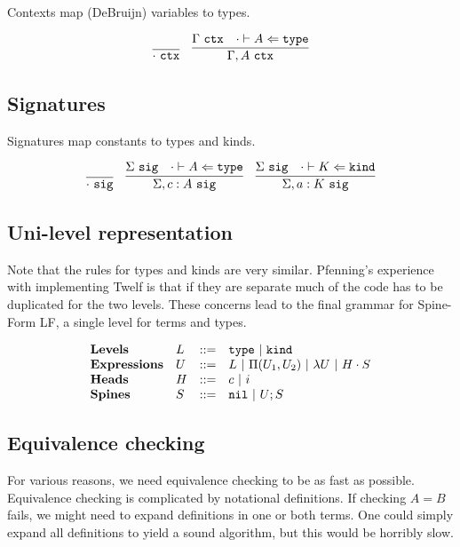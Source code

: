 \documentclass[11pt,twoside]{article}
\begin{document}
Contexts map (DeBruijn) variables to types.  

\newcommand{\Ctx}{\ \mathtt{ctx}}
\bigskip 
\framebox{$\Gamma\Ctx$}
\bigskip 

$$
\begin{array}{cc}
\infer{\cdot\Ctx}{} &
\infer{\Gamma,A\Ctx}{\Gamma\Ctx & \CheckTy[\cdot]{A}{\Type}}
\end{array} 
$$

\subsection{Signatures}

Signatures map constants to types and kinds.

\newcommand{\Sig}{\ \mathtt{sig}}
\bigskip 
\framebox{$\Sigma\Sig$}
\bigskip 

$$
\begin{array}{ccc}
\infer{\cdot\Sig}{}&
\infer{\Sigma,c:A\Sig}{\Sigma\Sig & \CheckTy[\cdot]{A}{\Type}}&
\infer{\Sigma,a:K\Sig}{\Sigma\Sig & \CheckTy[\cdot]{K}{\Kind}}
\end{array} 
$$


\subsection{Uni-level representation}

Note that the rules for types and kinds are very similar.
Pfenning's experience with implementing Twelf is that if they
are separate much of the code has to be duplicated for
the two levels.  These concerns lead to the final 
grammar for Spine-Form LF, a single level for terms and types.

$$
\begin{array}{llll}
\mathbf{Levels} & L & ::= & \mathtt{type} \ |\  \mathtt{kind} \\
\mathbf{Expressions} & U & ::= & L \ |\  \Pi(U_1,U_2) \ |\  \lambda U \ |\  H\cdot S \\
\mathbf{Heads} & H & ::= & c \ |\  i\\
\mathbf{Spines} & S & ::= & \mathtt{nil} \ |\  U;S\\
\end{array} 
$$

\subsection{Equivalence checking} \label{main:equiv}
  For various reasons, we need equivalence checking to
be as fast as possible.  Equivalence checking is complicated
by notational definitions.  If checking $A=B$ fails, we might need
to expand definitions in one or both terms.  One could simply
expand all definitions to yield a sound algorithm, but this would
be horribly slow.  
\end{document}
